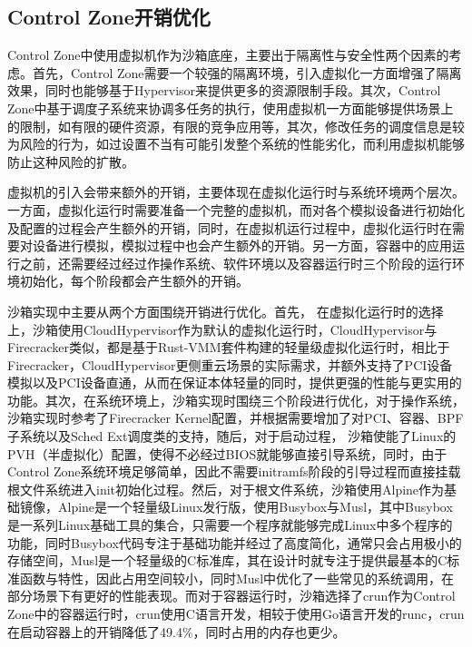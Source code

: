 \subsection{Control Zone开销优化}


Control Zone中使用虚拟机作为沙箱底座，主要出于隔离性与安全性两个因素的考虑。首先，Control Zone需要一个较强的隔离环境，引入虚拟化一方面增强了隔离效果，同时也能够基于Hypervisor来提供更多的资源限制手段。其次，Control Zone中基于调度子系统来协调多任务的执行，使用虚拟机一方面能够提供场景上的限制，如有限的硬件资源，有限的竞争应用等，其次，修改任务的调度信息是较为风险的行为，如过设置不当有可能引发整个系统的性能劣化，而利用虚拟机能够防止这种风险的扩散。

虚拟机的引入会带来额外的开销，主要体现在虚拟化运行时与系统环境两个层次。一方面，虚拟化运行时需要准备一个完整的虚拟机，而对各个模拟设备进行初始化及配置的过程会产生额外的开销，同时，在虚拟机运行过程中，虚拟化运行时在需要对设备进行模拟，模拟过程中也会产生额外的开销。另一方面，容器中的应用运行之前，还需要经过经过作操作系统、软件环境以及容器运行时三个阶段的运行环境初始化，每个阶段都会产生额外的开销。

沙箱实现中主要从两个方面围绕开销进行优化。首先， 在虚拟化运行时的选择上，沙箱使用CloudHypervisor作为默认的虚拟化运行时，CloudHypervisor与Firecracker类似，都是基于Rust-VMM套件构建的轻量级虚拟化运行时，相比于Firecracker，CloudHypervisor更侧重云场景的实际需求，并额外支持了PCI设备模拟以及PCI设备直通，从而在保证本体轻量的同时，提供更强的性能与更实用的功能\citep{agache2020firecracker}。其次，在系统环境上，沙箱实现时围绕三个阶段进行优化，对于操作系统，沙箱实现时参考了Firecracker Kernel配置，并根据需要增加了对PCI、容器、BPF子系统以及Sched Ext调度类的支持，随后，对于启动过程， 沙箱使能了Linux的PVH（半虚拟化）配置，使得不必经过BIOS就能够直接引导系统，同时，由于Control Zone系统环境足够简单，因此不需要initramfs阶段的引导过程而直接挂载根文件系统进入init初始化过程。然后，对于根文件系统，沙箱使用Alpine\citep{alpine}作为基础镜像，Alpine是一个轻量级Linux发行版，使用Busybox与Musl，其中Busybox是一系列Linux基础工具的集合，只需要一个程序就能够完成Linux中多个程序的功能，同时Busybox代码专注于基础功能并经过了高度简化，通常只会占用极小的存储空间，Musl是一个轻量级的C标准库，其在设计时就专注于提供最基本的C标准函数与特性，因此占用空间较小，同时Musl中优化了一些常见的系统调用，在部分场景下有更好的性能表现。而对于容器运行时，沙箱选择了crun\citep{crun}作为Control Zone中的容器运行时，crun使用C语言开发，相较于使用Go语言开发的runc，crun在启动容器上的开销降低了49.4\%，同时占用的内存也更少。

